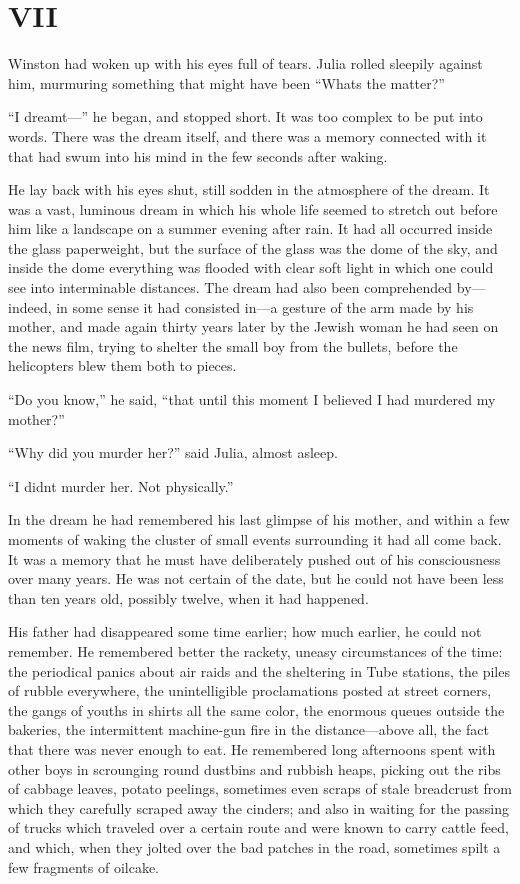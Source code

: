 \section{VII}\label{vii-1}

Winston had woken up with his eyes full of tears. Julia rolled sleepily
against him, murmuring something that might have been
``What\textquotesingle s the matter?''

``I dreamt---'' he began, and stopped short. It was too complex to be put
into words. There was the dream itself, and there was a memory connected
with it that had swum into his mind in the few seconds after waking.

He lay back with his eyes shut, still sodden in the atmosphere of the
dream. It was a vast, luminous dream in which his whole life seemed to
stretch out before him like a landscape on a summer evening after rain.
It had all occurred inside the glass paperweight, but the surface of the
glass was the dome of the sky, and inside the dome everything was
flooded with clear soft light in which one could see into interminable
distances. The dream had also been comprehended by---indeed, in some
sense it had consisted in---a gesture of the arm made by his mother, and
made again thirty years later by the Jewish woman he had seen on the
news film, trying to shelter the small boy from the bullets, before the
helicopters blew them both to pieces.

``Do you know,'' he said, ``that until this moment I believed I had
murdered my mother?''

``Why did you murder her?'' said Julia, almost asleep.

``I didn\textquotesingle t murder her. Not physically.''

In the dream he had remembered his last glimpse of his mother, and
within a few moments of waking the cluster of small events surrounding
it had all come back. It was a memory that he must have deliberately
pushed out of his consciousness over many years. He was not certain of
the date, but he could not have been less than ten years old, possibly
twelve, when it had happened.

His father had disappeared some time earlier; how much earlier, he could
not remember. He remembered better the rackety, uneasy circumstances of
the time: the periodical panics about air raids and the sheltering in
Tube stations, the piles of rubble everywhere, the unintelligible
proclamations posted at street corners, the gangs of youths in shirts
all the same color, the enormous queues outside the bakeries, the
intermittent machine-gun fire in the distance---above all, the fact that
there was never enough to eat. He remembered long afternoons spent with
other boys in scrounging round dustbins and rubbish heaps, picking out
the ribs of cabbage leaves, potato peelings, sometimes even scraps of
stale breadcrust from which they carefully scraped away the cinders; and
also in waiting for the passing of trucks which traveled over a certain
route and were known to carry cattle feed, and which, when they jolted
over the bad patches in the road, sometimes spilt a few fragments of
oilcake.

